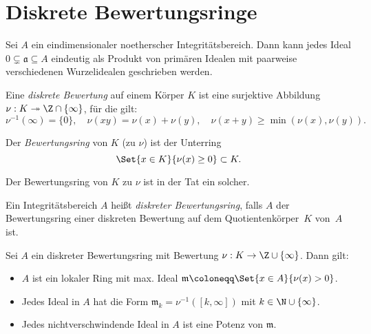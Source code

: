 \documentclass{cheat-sheet}
\newcommand{\aaa}{\mathfrak{a}}
\newcommand{\mmm}{\mathfrak{m}}
\newcommand{\thra}{\twoheadrightarrow}
\begin{document}

\section{Diskrete Bewertungsringe}


\begin{prop}
  Sei $A$ ein eindimensionaler noetherscher Integritätsbereich.
  Dann kann jedes Ideal $0 \subsetneq \aaa \subseteq A$ eindeutig als Produkt von primären Idealen mit paarweise verschiedenen Wurzelidealen geschrieben werden.
\end{prop}


\begin{defn}
  Eine \emph{diskrete Bewertung} auf einem Körper $K$ ist eine surjektive Abbildung $\nu : K \thra \Z \cap \{ \infty \}$, für die gilt:
  \[
    \nu^{-1}(\infty) = \{ 0 \}, \quad
    \nu(xy) = \nu(x) + \nu(y), \quad
    \nu(x + y) \geq \min (\nu(x), \nu(y)).
  \]
\end{defn}

\begin{lem}
   \quad
\end{lem}

\begin{defn}
  Der \emph{Bewertungsring} von $K$ (zu $\nu$) ist der Unterring
  \[
    \Set{x \in K}{\nu(x) \geq 0} \subset K.
  \]
\end{defn}

\begin{lem}
  Der Bewertungsring von $K$ zu $\nu$ ist in der Tat ein solcher.
\end{lem}

\begin{defn}
  Ein Integritätsbereich $A$ heißt \emph{diskreter Bewertungsring}, falls $A$ der Bewertungsring einer diskreten Bewertung auf dem Quotientenkörper~$K$ von~$A$ ist.
\end{defn}

\begin{prop}
  Sei $A$ ein diskreter Bewertungsring mit Bewertung $\nu : K \to \Z \cup \{ \infty \}$.
  Dann gilt:
  \begin{itemize}
    \item $A$ ist ein lokaler Ring mit max. Ideal $\mmm \coloneqq \Set{x \in A}{\nu(x) > 0}$.
    \item Jedes Ideal in $A$ hat die Form $\mmm_k = \nu^{-1}([k, \infty])$ mit $k \in \N \cup \{ \infty \}$. \\
    \item Jedes nichtverschwindende Ideal in $A$ ist eine Potenz von $\mmm$.
  \end{itemize}
\end{prop}
\end{document}
